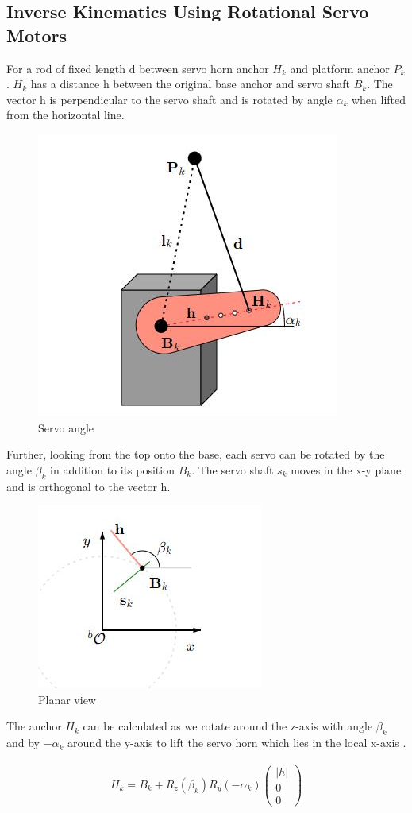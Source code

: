 \subsection{Inverse Kinematics Using Rotational Servo Motors}
For a rod of fixed length d between servo horn anchor $H_{k}$ and platform anchor $P_{k}$.  $H_{k}$ has a distance h between the original base anchor and servo shaft $B_{k}$. The vector h is perpendicular to the servo shaft and is rotated by angle $\alpha_{k}$ when lifted from the horizontal line.
\begin{center}
	\begin{figure}[!h]
	\centering
	\includegraphics[width=0.4\linewidth]{Figures/servo}
	\caption[Servo angle]{Servo angle \cite{Eisele_2019}}
	\end{figure}
\end{center}
Further, looking from the top onto the base, each servo can be rotated by the angle $\beta_{k}$ in addition to its position $B_{k}$. The servo shaft $s_{k}$ moves in the x-y plane and is orthogonal to the vector h.
\begin{center}
	\begin{figure}[!h]
	\centering
	\includegraphics[width=0.4\linewidth]{Figures/servo1}
	\caption[Planar view]{Planar view \cite{Eisele_2019}}
	\end{figure}
\end{center}
The anchor $H_{k}$ can be calculated as we rotate around the z-axis with angle $\beta_{k}$ and  by $-\alpha_{k}$ around the y-axis to lift the servo horn which lies in the local x-axis \cite{Eisele_2019}.
\begin{ceqn}
\begin{align}
	H_{k} = B_{k} + R_{z}(\beta_{k}) R_{y}(-\alpha_{k})\begin{pmatrix}
	|h|\\ 0 \\ 0
	\end{pmatrix}
	\label{eq:myeqn2}
\end{align}
\end{ceqn}
